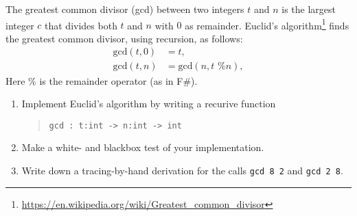 \label{gcd} The greatest common divisor (gcd) between two integers $t$
and $n$ is the largest integer $c$ that divides both $t$ and $n$ with
$0$ as remainder. Euclid's
algorithm\footnote{\url{https://en.wikipedia.org/wiki/Greatest_common_divisor}}
finds the greatest common divisor, using recursion, as follows:
  \begin{align}
    \text{gcd}(t,0) &= t, \label{gcd:1}
    \\ \text{gcd}(t,n) &= \text{gcd}(n, t \text{ \% } n), \label{gcd:2}
  \end{align}
Here $\%$ is the remainder operator (as in F\#).
\begin{enumerate}
\item Implement Euclid's algorithm by writing a recurive function
  \begin{quote}
    \lstinline{gcd : t:int -> n:int -> int}
  \end{quote}
\item Make a white- and blackbox test of your implementation.
\item Write down a tracing-by-hand derivation for the calls \lstinline{gcd 8 2} and \lstinline{gcd 2 8}.
\end{enumerate}
